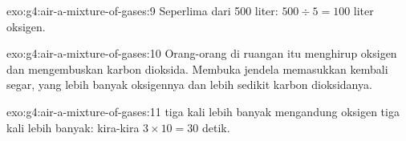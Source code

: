 \begin{solution}{exo:g4:air-a-mixture-of-gases:9}
Seperlima dari 500 liter: $500 \div 5 = 100$ liter oksigen.
\end{solution}

\begin{solution}{exo:g4:air-a-mixture-of-gases:10}
Orang-orang di ruangan itu menghirup oksigen dan mengembuskan karbon
dioksida. Membuka jendela memasukkan kembali  segar, yang lebih
banyak oksigennya dan lebih sedikit karbon dioksidanya.
\end{solution}

\begin{solution}{exo:g4:air-a-mixture-of-gases:11}
 tiga kali lebih banyak mengandung oksigen tiga kali lebih banyak:
kira-kira $3 \times 10 = 30$ detik.
\end{solution}
